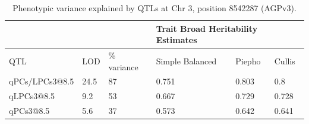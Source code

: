 \documentclass[9pt,twocolumn,twoside,lineno]{BioRxiv}
\begin{document}
\clearpage


\begin{table}[h!]
\begin{tabular}{@{}llllll@{}}
\toprule
               &      &             & \multicolumn{3}{l}{Trait Broad Heritability Estimates} \\ \midrule
QTL            & LOD  & \% variance & Simple Balanced        & Piepho        & Cullis        \\
qPCs/LPCs3@8.5 & 24.5 & 87          & 0.751                  & 0.803         & 0.8           \\
qLPCs3@8.5     & 9.2  & 53          & 0.667                  & 0.729         & 0.728         \\
qPCs3@8.5      & 5.6  & 37          & 0.573                  & 0.642         & 0.641         \\ \bottomrule
\end{tabular}
\label{tab:table2}
\caption{ Phenotypic variance explained by QTLs at Chr 3, position 8542287 (AGPv3).}
\end{table}

\clearpage

\renewcommand{\thefigure}{S\arabic{figure}}
\renewcommand{\thetable}{S\arabic{table}}%

\setcounter{figure}{0}
\setcounter{table}{0}
\end{document}
